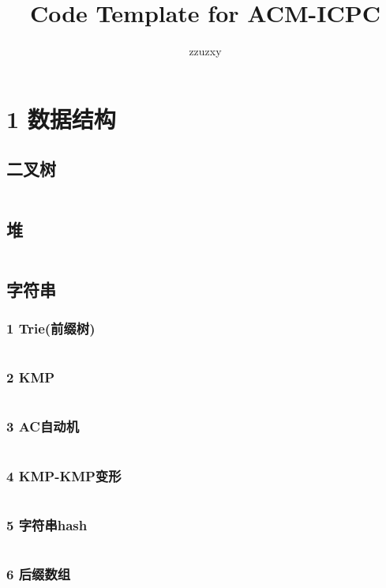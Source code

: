 \documentclass{article}
\title{Code Template for ACM-ICPC}
\author{zzuzxy}
\begin{document}
\begin{titlepage}
\maketitle
\thispagestyle{empty}
\pagebreak
\pagestyle{plain}
\tableofcontents
\end{titlepage}
\section{1 数据结构}
\subsection{二叉树}
\inputminted{c++}{/home/zzuzxy/t2/Template1.0/1 数据结构/二叉搜索树/二叉树.cpp}
\subsection{堆}
\inputminted{c++}{/home/zzuzxy/t2/Template1.0/1 数据结构/基础数据结构/堆.cpp}
\subsection{字符串}
\subsubsection{1 Trie(前缀树)}
\inputminted{c++}{/home/zzuzxy/t2/Template1.0/1 数据结构/字符串/1 Trie(前缀树).cpp}
\subsubsection{2 KMP}
\inputminted{c++}{/home/zzuzxy/t2/Template1.0/1 数据结构/字符串/2 KMP.cpp}
\subsubsection{3 AC自动机}
\inputminted{c++}{/home/zzuzxy/t2/Template1.0/1 数据结构/字符串/3 AC自动机.cpp}
\subsubsection{4 KMP-KMP变形}
\inputminted{c++}{/home/zzuzxy/t2/Template1.0/1 数据结构/字符串/4 KMP-KMP变形.cpp}
\subsubsection{5 字符串hash}
\inputminted{c++}{/home/zzuzxy/t2/Template1.0/1 数据结构/字符串/5 字符串hash.cpp}
\subsubsection{6 后缀数组}
\inputminted{c++}{/home/zzuzxy/t2/Template1.0/1 数据结构/字符串/6 后缀数组.cpp}
\end{document}
